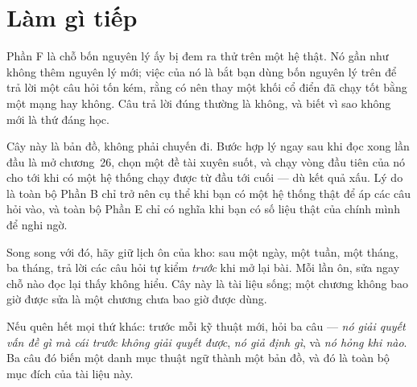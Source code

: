 \documentclass[deep_learning.tex]{subfiles}
\begin{document}
\section{Làm gì tiếp}

Phần F là chỗ bốn nguyên lý ấy bị đem ra thử trên một hệ thật. Nó gần như không thêm nguyên lý mới; việc của nó là bắt bạn dùng bốn nguyên lý trên để trả lời một câu hỏi tốn kém, rằng có nên thay một khối cổ điển đã chạy tốt bằng một mạng hay không. Câu trả lời đúng thường là không, và biết vì sao không mới là thứ đáng học.

Cây này là bản đồ, không phải chuyến đi. Bước hợp lý ngay sau khi đọc xong lần đầu là mở chương~26, chọn một đề tài xuyên suốt, và chạy vòng đầu tiên của nó cho tới khi có một hệ thống chạy được từ đầu tới cuối --- dù kết quả xấu. Lý do là toàn bộ Phần B chỉ trở nên cụ thể khi bạn có một hệ thống thật để áp các câu hỏi vào, và toàn bộ Phần E chỉ có nghĩa khi bạn có số liệu thật của chính mình để nghi ngờ.

Song song với đó, hãy giữ lịch ôn của kho: sau một ngày, một tuần, một tháng, ba tháng, trả lời các câu hỏi tự kiểm \emph{trước} khi mở lại bài. Mỗi lần ôn, sửa ngay chỗ nào đọc lại thấy không hiểu. Cây này là tài liệu sống; một chương không bao giờ được sửa là một chương chưa bao giờ được dùng.

\begin{cannho}
Nếu quên hết mọi thứ khác: trước mỗi kỹ thuật mới, hỏi ba câu --- \emph{nó giải quyết vấn đề gì mà cái trước không giải quyết được}, \emph{nó giả định gì}, và \emph{nó hỏng khi nào}. Ba câu đó biến một danh mục thuật ngữ thành một bản đồ, và đó là toàn bộ mục đích của tài liệu này.
\end{cannho}
\end{document}
